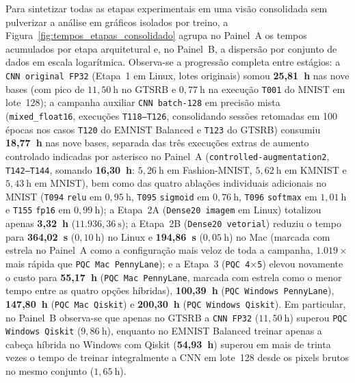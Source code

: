 \documentclass[
    12pt,
    openright,
    oneside,
    a4paper,
    english,
    brazil
]{abntex2}
\begin{document}
Para sintetizar todas as etapas experimentais em uma visão consolidada sem pulverizar a análise em gráficos isolados por treino, a Figura~\ref{fig:tempos_etapas_consolidado} agrupa no Painel~A os tempos acumulados por etapa arquitetural e, no Painel~B, a dispersão por conjunto de dados em escala logarítmica. Observa-se a progressão completa entre estágios: a \texttt{CNN original FP32} (Etapa~1 em Linux, lotes originais) somou \textbf{25,81~h} nas nove bases (com pico de \(11{,}50~\text{h}\) no GTSRB e \(0{,}77~\text{h}\) na execução \texttt{T001} do MNIST em lote~128); a campanha auxiliar \texttt{CNN batch-128} em precisão mista (\texttt{mixed\_float16}, execuções \texttt{T118--T126}, consolidando sessões retomadas em 100 épocas nos casos \texttt{T120} do EMNIST Balanced e \texttt{T123} do GTSRB) consumiu \textbf{18,77~h} nas nove bases, separada das três execuções extras de aumento controlado indicadas por asterisco no Painel~A (\texttt{controlled-augmentation2}, \texttt{T142--T144}, somando \textbf{16,30~h}: \(5{,}26~\text{h}\) em Fashion-MNIST, \(5{,}62~\text{h}\) em KMNIST e \(5{,}43~\text{h}\) em MNIST), bem como das quatro ablações individuais adicionais no MNIST (\texttt{T094} \texttt{relu} em \(0{,}95~\text{h}\), \texttt{T095} \texttt{sigmoid} em \(0{,}76~\text{h}\), \texttt{T096} \texttt{softmax} em \(1{,}01~\text{h}\) e \texttt{T155} \texttt{fp16} em \(0{,}99~\text{h}\)); a Etapa~2A (\texttt{Dense20 imagem} em Linux) totalizou apenas \textbf{3,32~h} (\(11.936{,}36~\text{s}\)); a Etapa~2B (\texttt{Dense20 vetorial}) reduziu o tempo para \textbf{364,02~s} (\(0{,}10~\text{h}\)) no Linux e \textbf{194,86~s} (\(0{,}05~\text{h}\)) no Mac (marcada com estrela no Painel~A como a configuração mais veloz de toda a campanha, \(1.019\times\) mais rápida que \texttt{PQC Mac PennyLane}); e a Etapa~3 (\texttt{PQC 4\(\times\)5}) elevou novamente o custo para \textbf{55,17~h} (\texttt{PQC Mac PennyLane}, marcada com estrela como o menor tempo entre as quatro opções híbridas), \textbf{100,39~h} (\texttt{PQC Windows PennyLane}), \textbf{147,80~h} (\texttt{PQC Mac Qiskit}) e \textbf{200,30~h} (\texttt{PQC Windows Qiskit}). Em particular, no Painel~B observa-se que apenas no GTSRB a \texttt{CNN FP32} (\(11{,}50~\text{h}\)) superou \texttt{PQC Windows Qiskit} (\(9{,}86~\text{h}\)), enquanto no EMNIST Balanced treinar apenas a cabeça híbrida no Windows com Qiskit (\textbf{54,93~h}) superou em mais de trinta vezes o tempo de treinar integralmente a CNN em lote~128 desde os pixels brutos no mesmo conjunto (\(1{,}65~\text{h}\)).
\end{document}
